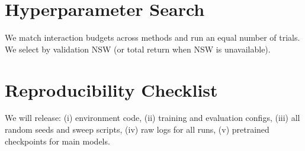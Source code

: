 \documentclass{article}
\theoremstyle{definition}
\theoremstyle{plain}
\theoremstyle{remark}
\begin{document}
\section{Hyperparameter Search}
\label{app:hparam_search}

We match interaction budgets across methods and run an equal number of trials.
We select by validation NSW (or total return when NSW is unavailable).

\section{Reproducibility Checklist}
\label{app:repro}

We will release:
(i) environment code,
(ii) training and evaluation configs,
(iii) all random seeds and sweep scripts,
(iv) raw logs for all runs,
(v) pretrained checkpoints for main models.
\end{document}
